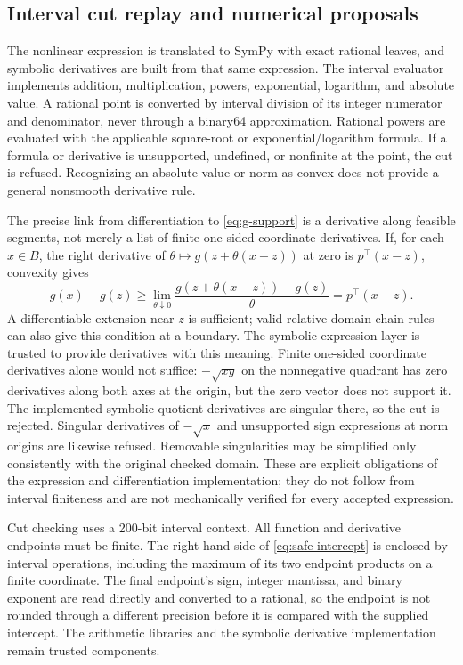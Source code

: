\subsection{Interval cut replay and numerical proposals}
\label{sec:cut-implementation}
The nonlinear expression is translated to SymPy with exact rational leaves, and symbolic derivatives are built from that same expression. The interval evaluator implements addition, multiplication, powers, exponential, logarithm, and absolute value. A rational point is converted by interval division of its integer numerator and denominator, never through a binary64 approximation. Rational powers are evaluated with the applicable square-root or exponential/logarithm formula. If a formula or derivative is unsupported, undefined, or nonfinite at the point, the cut is refused. Recognizing an absolute value or norm as convex does not provide a general nonsmooth derivative rule.

The precise link from differentiation to \eqref{eq:g-support} is a derivative along feasible segments, not merely a list of finite one-sided coordinate derivatives. If, for each $x\in B$, the right derivative of $\theta\mapsto g(z+\theta(x-z))$ at zero is $p^\top(x-z)$, convexity gives
\[
 g(x)-g(z)\geq \lim_{\theta\downarrow0}
 \frac{g(z+\theta(x-z))-g(z)}{\theta}=p^\top(x-z).
\]
A differentiable extension near $z$ is sufficient; valid relative-domain chain rules can also give this condition at a boundary. The symbolic-expression layer is trusted to provide derivatives with this meaning. Finite one-sided coordinate derivatives alone would not suffice: $-\sqrt{xy}$ on the nonnegative quadrant has zero derivatives along both axes at the origin, but the zero vector does not support it. The implemented symbolic quotient derivatives are singular there, so the cut is rejected. Singular derivatives of $-\sqrt{x}$ and unsupported sign expressions at norm origins are likewise refused. Removable singularities may be simplified only consistently with the original checked domain. These are explicit obligations of the expression and differentiation implementation; they do not follow from interval finiteness and are not mechanically verified for every accepted expression.

Cut checking uses a 200-bit interval context. All function and derivative endpoints must be finite. The right-hand side of \eqref{eq:safe-intercept} is enclosed by interval operations, including the maximum of its two endpoint products on a finite coordinate. The final endpoint's sign, integer mantissa, and binary exponent are read directly and converted to a rational, so the endpoint is not rounded through a different precision before it is compared with the supplied intercept. The arithmetic libraries and the symbolic derivative implementation remain trusted components.


